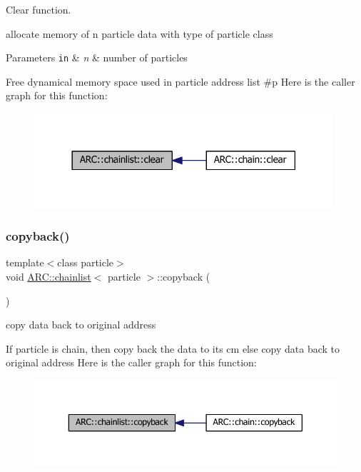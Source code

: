 Clear function. 

allocate memory of n particle data with type of particle class 
\begin{DoxyParams}[1]{Parameters}
\mbox{\tt in}  & {\em n} & number of particles\\
\hline
\end{DoxyParams}
Free dynamical memory space used in particle address list \#p Here is the caller graph for this function\+:
\nopagebreak
\begin{figure}[H]
\begin{center}
\leavevmode
\includegraphics[width=314pt]{classARC_1_1chainlist_ad0b0f86e25b46acf2a9507c1a7deb700_icgraph}
\end{center}
\end{figure}
\hypertarget{classARC_1_1chainlist_a2249db484a34384214c4fbba8d4d19ad}{}\label{classARC_1_1chainlist_a2249db484a34384214c4fbba8d4d19ad} 
\subsubsection{\texorpdfstring{copyback()}{copyback()}}
{\footnotesize\ttfamily template$<$class particle$>$ \\
void \hyperlink{classARC_1_1chainlist}{A\+R\+C\+::chainlist}$<$ particle $>$\+::copyback (\begin{DoxyParamCaption}{ }\end{DoxyParamCaption})\hspace{0.3cm}{\ttfamily [inline]}}



copy data back to original address 

If particle is chain, then copy back the data to its cm else copy data back to original address Here is the caller graph for this function\+:
\nopagebreak
\begin{figure}[H]
\begin{center}
\leavevmode
\includegraphics[width=350pt]{classARC_1_1chainlist_a2249db484a34384214c4fbba8d4d19ad_icgraph}
\end{center}
\end{figure}
\hypertarget{classARC_1_1chainlist_a2dd5af449a9e85f487e1a2332b64060f}{}\label{classARC_1_1chainlist_a2dd5af449a9e85f487e1a2332b64060f} 
